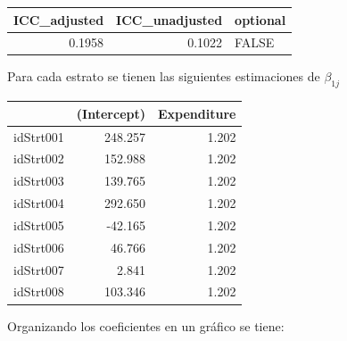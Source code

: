 \documentclass[
  12pt,
]{book}
\newenvironment{Shaded}{\begin{snugshade}}{\end{snugshade}}
\newcommand{\DecValTok}[1]{\textcolor[rgb]{0.00,0.00,0.81}{#1}}
\newcommand{\FunctionTok}[1]{\textcolor[rgb]{0.00,0.00,0.00}{#1}}
\newcommand{\NormalTok}[1]{#1}
\newcommand{\SpecialCharTok}[1]{\textcolor[rgb]{0.00,0.00,0.00}{#1}}
\begin{document}
\begin{tabular}{r|r|l}
\hline
ICC\_adjusted & ICC\_unadjusted & optional\\
\hline
0.1958 & 0.1022 & FALSE\\
\hline
\end{tabular}

Para cada estrato se tienen las siguientes estimaciones de \(\beta_{1j}\)

\begin{Shaded}
\end{Shaded}

\begin{tabular}{l|r|r}
\hline
  & (Intercept) & Expenditure\\
\hline
idStrt001 & 248.257 & 1.202\\
\hline
idStrt002 & 152.988 & 1.202\\
\hline
idStrt003 & 139.765 & 1.202\\
\hline
idStrt004 & 292.650 & 1.202\\
\hline
idStrt005 & -42.165 & 1.202\\
\hline
idStrt006 & 46.766 & 1.202\\
\hline
idStrt007 & 2.841 & 1.202\\
\hline
idStrt008 & 103.346 & 1.202\\
\hline
\end{tabular}

Organizando los coeficientes en un gráfico se tiene:
\end{document}
